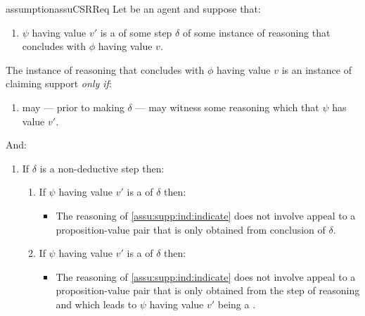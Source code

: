 \begin{note}
  \begin{restatable}{assumption}{assuCSRReq}
    \label{assu:supp:independence}
    Let \vAgent{} be an agent and suppose that:
    \begin{enumerate}[label=\Alph*., ref=(\Alph*)]
    \item
      \label{assu:supp:ind:step}
      \(\psi\) having value \(v'\) is a \requ{} of some step \(\delta\) of some instance of reasoning that concludes with \(\phi\) having value \(v\).
    \end{enumerate}

    The instance of reasoning that concludes with \(\phi\) having value \(v\) is an instance of claiming support \emph{only if}:

    \begin{enumerate}[label=\arabic*., ref=(\arabic*)]
    \item
      \label{assu:supp:ind:indicate}
      \vAgent{} may --- prior to making \(\delta\) --- may witness some reasoning which  that \(\psi\) has value \(v'\).
    \end{enumerate}
    And:
    \begin{enumerate}[label=\arabic*., ref=(\arabic*),resume]
    \item
      \label{assu:supp:ind:circular}
      If \(\delta\) is a non-deductive step then:
      \begin{enumerate}[label=\alph*., ref=(\alph*)]
      \item
        \label{assu:supp:ind:circular:p}
        If \(\psi\) having value \(v'\) is a \prequ{} of \(\delta\) then:
        \begin{itemize}
        \item
          The reasoning of \ref{assu:supp:ind:indicate} does not involve appeal to a proposition-value pair that is only obtained from conclusion of \(\delta\).
        \end{itemize}
      \item
        \label{assu:supp:ind:circular:cp}
        If \(\psi\) having value \(v'\) is  a \cprequ{} of \(\delta\) then:
        \begin{itemize}
        \item
          The reasoning of \ref{assu:supp:ind:indicate} does not involve appeal to a proposition-value pair that is only obtained from the step of reasoning and  which leads to \(\psi\) having value \(v'\) being a \prequ{}.
        \end{itemize}
      \end{enumerate}
    \end{enumerate}
    \vspace{-\baselineskip}
  \end{restatable}
\end{note}

